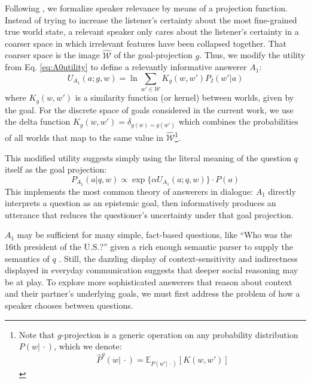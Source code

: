 \documentclass[11pt, floatsintext]{apa6}
\newcommand{\E}[2]{\ensuremath{\mathbb{E}_{#1}\left [#2 \right]}}
\begin{document}
Following , we formalize speaker relevance by means of a projection function. Instead of trying to increase the listener's certainty about the most fine-grained true world state, a relevant speaker only cares about the listener's certainty in a coarser space in which irrelevant features have been collapsed together. That coarser space is the image $\widehat{\mathcal{W}}$ of the goal-projection $g$.
Thus, we modify the utility from Eq. \ref{eq:A0utility} to define a relevantly informative answerer $A_1$: 
\begin{equation}
U_{A_1}(a; g, w) = \ln \sum_{w' \in \mathcal{W}} K_g(w, w') P_I(w' | a)
\end{equation}
where $K_g(w,w')$ is a similarity function (or kernel) between worlds, given by the goal. For the discrete space of goals considered in the current work, we use the delta function $K_g(w,w') = \delta_{g(w)=g(w')}$ which combines the probabilities of all worlds that map to the same value in $\widehat{\mathcal{W}}$\footnote{Note that $g$-projection is a generic operation on any probability distribution $P(w|\,\cdot)$, which we denote: 
$$\widehat{P}^g(w|\, \cdot) = \E{P(w'|\, \cdot)}{K(w,w')}$$
}.

This modified utility suggests simply using the literal meaning of the question $q$ itself as the goal projection:
$$P_{A_1}(a|q,w) \propto \exp\{\alpha U_{A_1}(a; q,w)\} \cdot P(a)$$
This implements the most common theory of answerers in dialogue: $A_1$ directly interprets a question as an epistemic goal, then informatively produces an utterance that reduces the questioner's uncertainty under that goal projection. 

$A_1$ may be sufficient for many simple, fact-based questions, like ``Who was the 16th president of the U.S.?'' given a rich enough semantic parser to supply the semantics of $q$ \cite{BerantChouFrostigLiang13_FreebaseQAPairs}. Still, the dazzling display of context-sensitivity and indirectness displayed in everyday communication suggests that deeper social reasoning may be at play. To explore more sophisticated answerers that reason about context and their partner's underlying goals, we must first address the problem of how a speaker chooses between questions.
\end{document}
